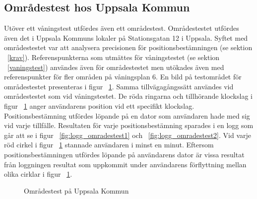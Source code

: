 \documentclass[a4paper,12pt]{article}
\begin{document}
 \subsection{Områdestest hos Uppsala Kommun}
 Utöver ett våningstest utfördes även ett områdestest. Områdestestet utfördes även det i Uppsala Kommuns lokaler på Stationsgatan 12 i Uppsala. Syftet med områdestestet var att analysera precisionen för positionsbestämningen (se sektion ~\ref{krav}). Referenspunkterna som utmättes för våningstestet (se sektion ~\ref{vaningstest}) användes även för områdestestet men utökades även med referenspunkter för fler områden på våningsplan 6. En bild på testområdet för områdestestet presenteras i figur ~\ref{fig:omrades_test}. Samma tillvägagångssätt användes vid områdestestet som vid våningstestet. De röda ringarna och tillhörande klockslag i figur ~\ref{fig:omrades_test} anger användarens position vid ett specifikt klockslag. Positionsbestämning utfördes löpande på en dator som användaren hade med sig vid varje tillfälle. Resultaten för varje positionsbestämning sparades i en logg som går att se i figur ~\ref{fig:logg_omradestest1} och ~\ref{fig:logg_omradestest2}. Vid varje röd cirkel i figur ~\ref{fig:omrades_test} stannade användaren i minst en minut. Eftersom positionsbestämningen utfördes löpande på användarens dator är vissa resultat från loggningen resultat som uppkommit under användarens förflyttning mellan olika cirklar i figur ~\ref{fig:omrades_test}.

 \begin{figure}[H]
   \centering
   \caption{Områdestest på Uppsala Kommun}
   \label{fig:omrades_test}
 \end{figure}
\end{document}
